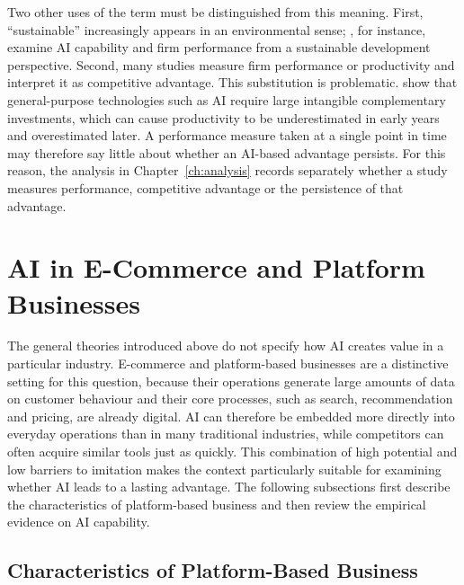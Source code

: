 Two other uses of the term must be distinguished from this meaning. First, \enquote{sustainable} increasingly appears in an environmental sense; \textcite{fossowamba2024}, for instance, examine AI capability and firm performance from a sustainable development perspective. Second, many studies measure firm performance or productivity and interpret it as competitive advantage. This substitution is problematic. \textcite{brynjolfsson2021} show that general-purpose technologies such as AI require large intangible complementary investments, which can cause productivity to be underestimated in early years and overestimated later. A performance measure taken at a single point in time may therefore say little about whether an AI-based advantage persists. For this reason, the analysis in Chapter~\ref{ch:analysis} records separately whether a study measures performance, competitive advantage or the persistence of that advantage.

\section{AI in E-Commerce and Platform Businesses}
\label{sec:context}

The general theories introduced above do not specify how AI creates value in a particular industry. E-commerce and platform-based businesses are a distinctive setting for this question, because their operations generate large amounts of data on customer behaviour and their core processes, such as search, recommendation and pricing, are already digital. AI can therefore be embedded more directly into everyday operations than in many traditional industries, while competitors can often acquire similar tools just as quickly. This combination of high potential and low barriers to imitation makes the context particularly suitable for examining whether AI leads to a lasting advantage. The following subsections first describe the characteristics of platform-based business and then review the empirical evidence on AI capability.

\subsection{Characteristics of Platform-Based Business}
\label{sec:platforms}

